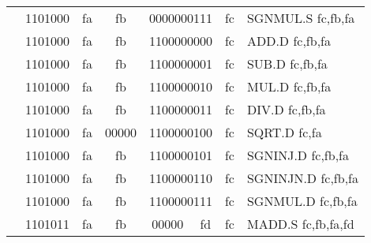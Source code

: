 \begin{table}[p]
\begin{small}
\begin{center}
\begin{tabular}{rcccccccccl}
&
\multicolumn{2}{|c|}{1101000} &
\multicolumn{1}{c|}{fa} &
\multicolumn{1}{c|}{fb} &
\multicolumn{4}{c|}{0000000111} &
\multicolumn{1}{c|}{fc} & SGNMUL.S fc,fb,fa \\
\cline{2-10}
  

&
\multicolumn{2}{|c|}{1101000} &
\multicolumn{1}{c|}{fa} &
\multicolumn{1}{c|}{fb} &
\multicolumn{4}{c|}{1100000000} &
\multicolumn{1}{c|}{fc} & ADD.D fc,fb,fa \\
\cline{2-10}
  

&
\multicolumn{2}{|c|}{1101000} &
\multicolumn{1}{c|}{fa} &
\multicolumn{1}{c|}{fb} &
\multicolumn{4}{c|}{1100000001} &
\multicolumn{1}{c|}{fc} & SUB.D fc,fb,fa \\
\cline{2-10}
  

&
\multicolumn{2}{|c|}{1101000} &
\multicolumn{1}{c|}{fa} &
\multicolumn{1}{c|}{fb} &
\multicolumn{4}{c|}{1100000010} &
\multicolumn{1}{c|}{fc} & MUL.D fc,fb,fa \\
\cline{2-10}
  

&
\multicolumn{2}{|c|}{1101000} &
\multicolumn{1}{c|}{fa} &
\multicolumn{1}{c|}{fb} &
\multicolumn{4}{c|}{1100000011} &
\multicolumn{1}{c|}{fc} & DIV.D fc,fb,fa \\
\cline{2-10}
  

&
\multicolumn{2}{|c|}{1101000} &
\multicolumn{1}{c|}{fa} &
\multicolumn{1}{c|}{00000} &
\multicolumn{4}{c|}{1100000100} &
\multicolumn{1}{c|}{fc} & SQRT.D fc,fa \\
\cline{2-10}
  

&
\multicolumn{2}{|c|}{1101000} &
\multicolumn{1}{c|}{fa} &
\multicolumn{1}{c|}{fb} &
\multicolumn{4}{c|}{1100000101} &
\multicolumn{1}{c|}{fc} & SGNINJ.D fc,fb,fa \\
\cline{2-10}
  

&
\multicolumn{2}{|c|}{1101000} &
\multicolumn{1}{c|}{fa} &
\multicolumn{1}{c|}{fb} &
\multicolumn{4}{c|}{1100000110} &
\multicolumn{1}{c|}{fc} & SGNINJN.D fc,fb,fa \\
\cline{2-10}
  

&
\multicolumn{2}{|c|}{1101000} &
\multicolumn{1}{c|}{fa} &
\multicolumn{1}{c|}{fb} &
\multicolumn{4}{c|}{1100000111} &
\multicolumn{1}{c|}{fc} & SGNMUL.D fc,fb,fa \\
\cline{2-10}
  

&
\multicolumn{2}{|c|}{1101011} &
\multicolumn{1}{c|}{fa} &
\multicolumn{1}{c|}{fb} &
\multicolumn{3}{c|}{00000} &
\multicolumn{1}{c|}{fd} &
\multicolumn{1}{c|}{fc} & MADD.S fc,fb,fa,fd \\
\cline{2-10}
  


\end{tabular}
\end{center}
\end{small}
\end{table}
